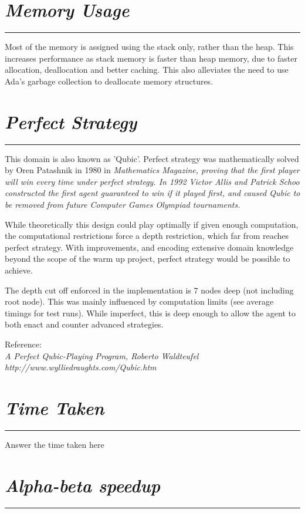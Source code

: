 \documentclass[10pt]{report}
\begin{document}
\begin{multicols}{2}
\section*{\emph{\textmd{Memory Usage}}}
\hrule
\vspace{0.4cm}

Most of the memory is assigned using the stack only, rather than the heap. This increases performance as stack memory is faster than heap memory, due to faster allocation, deallocation and better caching. This also alleviates the need to use Ada's garbage collection to deallocate memory structures.

\section*{\emph{{Perfect Strategy}}}
\hrule
\vspace{0.4cm}

This domain is also known as 'Qubic'. Perfect strategy was mathematically solved by Oren Patashnik in 1980 in \em Mathematics Magazine\em, proving that the first player will win every time under perfect strategy. In 1992 Victor Allis and Patrick Schoo constructed the first agent guaranteed to win if it played first, and caused Qubic to be removed from future Computer Games Olympiad tournaments.

While theoretically this design could play optimally if given enough computation, the computational restrictions force a depth restriction, which  far from reaches perfect strategy. With improvements, and encoding extensive domain knowledge beyond the scope of the warm up project, perfect strategy would be possible to achieve.

The depth cut off enforced in the implementation is 7 nodes deep (not including root node). This was mainly influenced by computation limits (see average timings for test runs). While imperfect, this is deep enough to allow the agent to both enact and counter advanced strategies.

Reference: \\
\em A Perfect Qubic-Playing Program\em, Roberto Waldteufel\\
http://www.wylliedraughts.com/Qubic.htm

\section*{\emph{{Time Taken}}}
\hrule
\vspace{0.4cm}

Answer the time taken here

\section*{\emph{\textmd{Alpha-beta speedup}}}
\hrule
\vspace{0.4cm}


\end{multicols}
\end{document}

